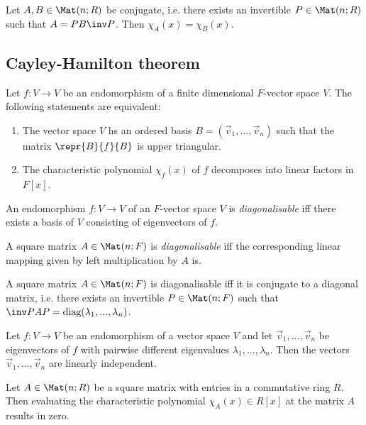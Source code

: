 \documentclass{article}
\begin{document}
\begin{lemma}
	Let $A,B\in\Mat(n; R)$ be conjugate, i.e. there exists an invertible $P\in\Mat(n; R)$ such that
	$A=PB\inv P$. Then $\chi_A(x)=\chi_B(x)$.
\end{lemma}

\subsection{Cayley-Hamilton theorem}

\begin{proposition}
	Let $f:V\to V$ be an endomorphism of a finite dimensional $F$-vector space $V$. The following
	statements are equivalent:
	\begin{enumerate}
		\item The vector space $V$ hs an ordered basis $B=(\vec v_1,...,\vec v_n)$ such that the matrix
		      $\repr{B}{f}{B}$ is upper triangular.
		\item The characteristic polynomial $\chi_f(x)$ of $f$ decomposes into linear factors in $F[x]$.
	\end{enumerate}
\end{proposition}

\begin{definition}
	An endomorphism $f:V\to V$ of an $F$-vector space $V$ is \emph{diagonalisable} iff there exists
	a basis of $V$ consisting of eigenvectors of $f$.

	A square matrix $A\in\Mat(n;F)$ is \emph{diagonalisable} iff the corresponding linear mapping
	given by left multiplication by $A$ is.
\end{definition}

\begin{theorem}
	A square matrix $A\in\Mat(n;F)$ is diagonalisable iff it is conjugate to a diagonal
	matrix, i.e. there exists an invertible $P\in\Mat(n;F)$ such that
	$\inv PAP=\text{diag}(\lambda_1,...,\lambda_n)$.
\end{theorem}

\begin{lemma}[Notes 4.6.9]
	Let $f:V\to V$ be an endomorphism of a vector space $V$ and let $\vec v_1,...,\vec v_n$ be
	eigenvectors of $f$ with pairwise different eigenvalues $\lambda_1,...,\lambda_n$. Then
	the vectors $\vec v_1,...,\vec v_n$ are linearly independent.
\end{lemma}

\begin{theorem}
	Let $A\in\Mat(n;R)$ be a square matrix with entries in a commutative ring $R$. Then evaluating the
	characteristic polynomial $\chi_A(x)\in R[x]$ at the matrix $A$ results in zero.
\end{theorem}
\end{document}

